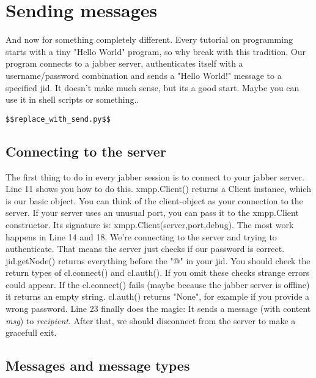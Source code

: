 \section{Sending messages}

And now for something completely different.
Every tutorial on programming starts with a tiny "Hello World" program, so why break with this tradition.
Our program connects to a jabber server, authenticates itself with a username/password combination and sends a "Hello World!" message to a specified jid. It doesn't make much sense, but its a good start. Maybe you can use it  in shell scripts or something..

\begin{verbatim}
$$replace_with_send.py$$
\end{verbatim}
\newpage
\subsection{Connecting to the server}
The first thing to do in every jabber session is to connect to your jabber server.
Line 11 shows you how to do this. xmpp.Client() returns a Client instance, which is our basic object.
You can think of the client-object as your connection to the server. If your server uses an unusual port, you can pass it to the xmpp.Client constructor. Its signature is: xmpp.Client(server,port,debug).
\newline
\newline
The most work happens in Line 14 and 18. We're connecting to the server and trying to authenticate. That means the server just checks if our password is correct. jid.getNode() returns everything before the "@" in your jid.
\newline
\newline
You should check the return types of cl.connect() and cl.auth(). If you omit these checks strange errors could appear. If the cl.connect() fails (maybe because the jabber server is offline) it returns  an empty string. cl.auth() returns "None", for example if you provide a wrong password.
\newline
\newline
Line 23 finally does the magic: It sends a message (with content \textit{msg}) to \textit{recipient}.
After that, we should disconnect from the server to make a gracefull exit.

\subsection{Messages and message types}

